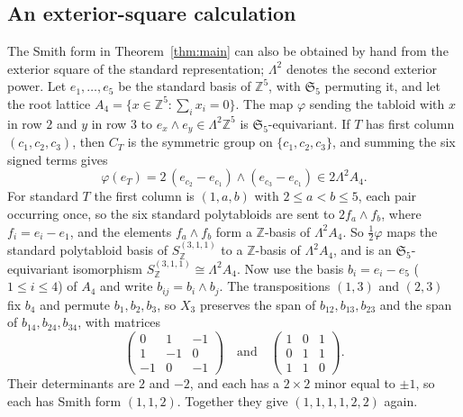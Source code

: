 \documentclass[11pt]{article}
\theoremstyle{remark}
\newcommand{\Z}{\mathbb{Z}}
\begin{document}
\begin{appendices}
\section{An exterior-square calculation}\label{app:hand}
The Smith form in Theorem~\ref{thm:main} can also be obtained by hand from
the exterior square of the standard representation; $\Lambda^2$ denotes the
second exterior power.
Let $e_1,\dots,e_5$ be the standard basis of $\Z^5$, with $\mathfrak{S}_5$
permuting it, and let the root lattice $A_4=\{x\in\Z^5:\sum_i x_i=0\}$. The map $\varphi$
sending the tabloid with $x$ in row $2$ and $y$ in row $3$ to
$e_x\wedge e_y\in\Lambda^2\Z^5$ is $\mathfrak{S}_5$-equivariant. If $T$ has
first column $(c_1,c_2,c_3)$, then $C_T$ is the symmetric group on
$\{c_1,c_2,c_3\}$, and summing the six signed terms gives
\[
\varphi(e_T)=2\,(e_{c_2}-e_{c_1})\wedge(e_{c_3}-e_{c_1})\in 2\Lambda^2A_4 .
\]
For standard $T$ the first column is $(1,a,b)$ with $2\le a<b\le5$, each
pair occurring once, so the six standard polytabloids are sent to $2f_a\wedge
f_b$, where $f_i=e_i-e_1$, and the elements $f_a\wedge f_b$ form a $\Z$-basis
of $\Lambda^2A_4$. So $\frac12\varphi$ maps the standard polytabloid basis of
$S^{(3,1,1)}_\Z$ to a $\Z$-basis of $\Lambda^2A_4$, and is an
$\mathfrak{S}_5$-equivariant isomorphism $S^{(3,1,1)}_\Z\cong\Lambda^2A_4$. Now use the basis $b_i=e_i-e_5$
($1\le i\le4$) of $A_4$ and write $b_{ij}=b_i\wedge b_j$. The transpositions
$(1,3)$ and $(2,3)$ fix $b_4$ and permute $b_1,b_2,b_3$, so $X_3$ preserves
the span of $b_{12},b_{13},b_{23}$ and the span of $b_{14},b_{24},b_{34}$,
with matrices
\[
\begin{pmatrix}0&1&-1\\1&-1&0\\-1&0&-1\end{pmatrix}
\quad\text{and}\quad
\begin{pmatrix}1&0&1\\0&1&1\\1&1&0\end{pmatrix}.
\]
Their determinants are $2$ and $-2$, and each has a $2\times2$ minor equal to
$\pm1$, so each has Smith form $(1,1,2)$. Together they give
$(1,1,1,1,2,2)$ again.

\end{appendices}
\end{document}
